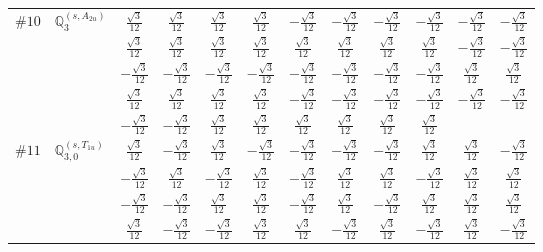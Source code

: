 \documentclass[fleqn,9pt,landscape]{jsarticle}
\begin{document}
\begin{center}
\begin{longtable}{lcccccccccc}
$ \#10\quad \mathbb{Q}_{3}^{(s,A_{2u})} $ & $ \frac{\sqrt{3}}{12} $ & $ \frac{\sqrt{3}}{12} $ & $ \frac{\sqrt{3}}{12} $ & $ \frac{\sqrt{3}}{12} $ & $ - \frac{\sqrt{3}}{12} $ & $ - \frac{\sqrt{3}}{12} $ & $ - \frac{\sqrt{3}}{12} $ & $ - \frac{\sqrt{3}}{12} $ & $ - \frac{\sqrt{3}}{12} $ & $ - \frac{\sqrt{3}}{12} $ \\
& $ \frac{\sqrt{3}}{12} $ & $ \frac{\sqrt{3}}{12} $ & $ \frac{\sqrt{3}}{12} $ & $ \frac{\sqrt{3}}{12} $ & $ \frac{\sqrt{3}}{12} $ & $ \frac{\sqrt{3}}{12} $ & $ \frac{\sqrt{3}}{12} $ & $ \frac{\sqrt{3}}{12} $ & $ - \frac{\sqrt{3}}{12} $ & $ - \frac{\sqrt{3}}{12} $ \\
& $ - \frac{\sqrt{3}}{12} $ & $ - \frac{\sqrt{3}}{12} $ & $ - \frac{\sqrt{3}}{12} $ & $ - \frac{\sqrt{3}}{12} $ & $ - \frac{\sqrt{3}}{12} $ & $ - \frac{\sqrt{3}}{12} $ & $ - \frac{\sqrt{3}}{12} $ & $ - \frac{\sqrt{3}}{12} $ & $ \frac{\sqrt{3}}{12} $ & $ \frac{\sqrt{3}}{12} $ \\
& $ \frac{\sqrt{3}}{12} $ & $ \frac{\sqrt{3}}{12} $ & $ \frac{\sqrt{3}}{12} $ & $ \frac{\sqrt{3}}{12} $ & $ - \frac{\sqrt{3}}{12} $ & $ - \frac{\sqrt{3}}{12} $ & $ - \frac{\sqrt{3}}{12} $ & $ - \frac{\sqrt{3}}{12} $ & $ - \frac{\sqrt{3}}{12} $ & $ - \frac{\sqrt{3}}{12} $ \\
& $ - \frac{\sqrt{3}}{12} $ & $ - \frac{\sqrt{3}}{12} $ & $ \frac{\sqrt{3}}{12} $ & $ \frac{\sqrt{3}}{12} $ & $ \frac{\sqrt{3}}{12} $ & $ \frac{\sqrt{3}}{12} $ & $ \frac{\sqrt{3}}{12} $ & $ \frac{\sqrt{3}}{12} $ & $  $ & $  $ \\ \hline
$ \#11\quad \mathbb{Q}_{3,0}^{(s,T_{1u})} $ & $ \frac{\sqrt{3}}{12} $ & $ - \frac{\sqrt{3}}{12} $ & $ \frac{\sqrt{3}}{12} $ & $ - \frac{\sqrt{3}}{12} $ & $ - \frac{\sqrt{3}}{12} $ & $ - \frac{\sqrt{3}}{12} $ & $ - \frac{\sqrt{3}}{12} $ & $ \frac{\sqrt{3}}{12} $ & $ \frac{\sqrt{3}}{12} $ & $ - \frac{\sqrt{3}}{12} $ \\
& $ - \frac{\sqrt{3}}{12} $ & $ \frac{\sqrt{3}}{12} $ & $ - \frac{\sqrt{3}}{12} $ & $ \frac{\sqrt{3}}{12} $ & $ - \frac{\sqrt{3}}{12} $ & $ \frac{\sqrt{3}}{12} $ & $ \frac{\sqrt{3}}{12} $ & $ - \frac{\sqrt{3}}{12} $ & $ \frac{\sqrt{3}}{12} $ & $ \frac{\sqrt{3}}{12} $ \\
& $ - \frac{\sqrt{3}}{12} $ & $ - \frac{\sqrt{3}}{12} $ & $ \frac{\sqrt{3}}{12} $ & $ \frac{\sqrt{3}}{12} $ & $ - \frac{\sqrt{3}}{12} $ & $ \frac{\sqrt{3}}{12} $ & $ - \frac{\sqrt{3}}{12} $ & $ \frac{\sqrt{3}}{12} $ & $ \frac{\sqrt{3}}{12} $ & $ \frac{\sqrt{3}}{12} $ \\
& $ \frac{\sqrt{3}}{12} $ & $ - \frac{\sqrt{3}}{12} $ & $ - \frac{\sqrt{3}}{12} $ & $ \frac{\sqrt{3}}{12} $ & $ \frac{\sqrt{3}}{12} $ & $ - \frac{\sqrt{3}}{12} $ & $ \frac{\sqrt{3}}{12} $ & $ - \frac{\sqrt{3}}{12} $ & $ \frac{\sqrt{3}}{12} $ & $ - \frac{\sqrt{3}}{12} $ \\

\end{longtable}
\end{center}
\end{document}
